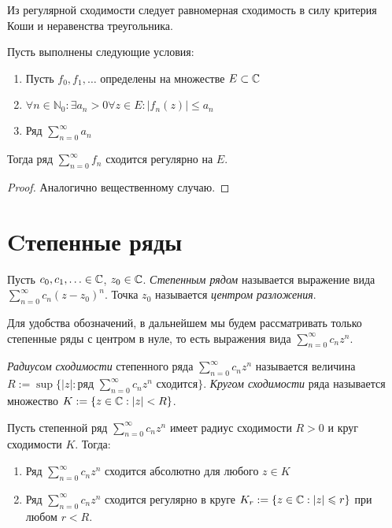 \begin{note}
	Из регулярной сходимости следует равномерная сходимость в силу критерия Коши и неравенства треугольника.
\end{note}

\begin{theorem}
	Пусть выполнены следующие условия:
	\begin{enumerate}
		\item Пусть $f_0, f_1, \dotsc$ определены на множестве $E \subset \mathbb{C}$
		\item $\forall n \in \mathbb{N}_0 : \exists a_n > 0 \forall z \in E: |f_n(z)| \le a_n$
		\item Ряд $\sum_{n=0}^\infty a_n$
	\end{enumerate}
	
	Тогда ряд $\sum_{n=0}^\infty f_n$ сходится регулярно на $E$.
\end{theorem}

\begin{proof}
	Аналогично вещественному случаю.
\end{proof}

\section{Cтепенные ряды}

\begin{definition}
	Пусть $c_0, c_1, \dotsc \in \mathbb{C}$, $z_0 \in \mathbb{C}$. \textit{Степенным рядом} называется выражение вида $\sum_{n=0}^\infty c_n(z - z_0)^n$. Точка $z_0$ называется \textit{центром разложения}.
\end{definition}

\begin{note}
	Для удобства обозначений, в дальнейшем мы будем рассматривать только степенные ряды с центром в нуле, то есть выражения вида $\sum_{n=0}^\infty c_nz^n$.
\end{note}

\pagebreak

\begin{definition}
	\textit{Радиусом сходимости} степенного ряда $\sum_{n=0}^\infty c_nz^n$ называется величина $R := \sup\{|z| : \text{ряд }\sum_{n=0}^\infty c_nz^n\text{ сходится}\}$. \textit{Кругом сходимости} ряда называется множество $K := \{z \in \mathbb{C} : |z| < R\}$.
\end{definition}

\begin{theorem}[Абеля]
	Пусть степенной ряд $\sum_{n=0}^\infty c_nz^n$ имеет радиус сходимости $R > 0$ и круг сходимости $K$. Тогда:
	\begin{enumerate}
		\item Ряд $\sum_{n=0}^\infty c_nz^n$ сходится абсолютно для любого $z \in K$
		\item Ряд $\sum_{n=0}^\infty c_nz^n$ сходится регулярно в круге $K_r := \{z \in \mathbb{C}: |z| \leqslant r\}$ при любом $r < R$.
	\end{enumerate}
\end{theorem}

